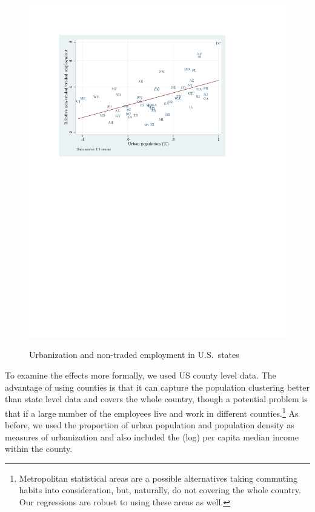 \documentclass[12pt]{article}
\begin{document}
\begin{figure}[h!]
\centering
  \includegraphics[width=0.7\linewidth]{figures/sc_state}\\
  \caption{Urbanization and non-traded employment in U.S.~states}\label{fig:nt-states}
\end{figure}


To examine the effects more formally, we used US county level data.
The advantage of using counties is that it can capture the
population clustering better than state level data and covers the
whole country, though a potential problem is that if a large number
of the employees live and work in different
counties.\footnote{Metropolitan statistical areas are a possible
alternatives taking commuting habits into consideration, but,
naturally, do not covering the whole country. Our regressions are
robust to using these areas as well.} As before, we used the
proportion of urban population and population density as measures of
urbanization and also included the (log) per capita median income
within the county.
\end{document}
